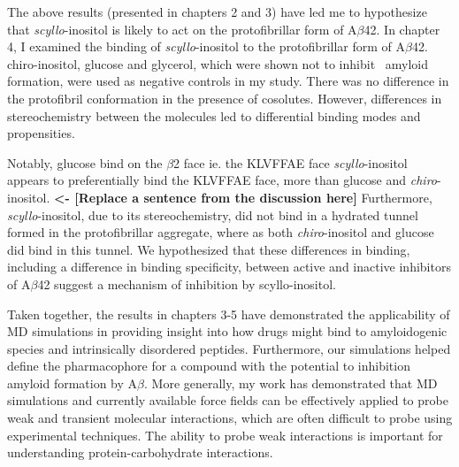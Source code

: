 The above results (presented in chapters 2 and 3) have led me to hypothesize that \textit{scyllo}-inositol is likely to act on the protofibrillar form of A$\beta$42.  In chapter 4, I examined the binding of \textit{scyllo}-inositol to the protofibrillar form of A$\beta$42. chiro-inositol, glucose and glycerol, which were shown not to inhibit \ amyloid formation, were used as negative controls in my study. There was no difference in the protofibril conformation in the presence of cosolutes. However, differences in stereochemistry between the molecules led to differential binding modes and propensities. 

Notably, glucose bind on the $\beta$2 face ie. the KLVFFAE face \textit{scyllo}-inositol appears to preferentially bind the KLVFFAE face, more than glucose and \textit{chiro}-inositol.  \textbf{<- [Replace a sentence from the discussion here]}  Furthermore, \textit{scyllo}-inositol, due to its stereochemistry, did not bind in a hydrated tunnel formed in the protofibrillar aggregate, where as both \textit{chiro}-inositol and glucose did bind in this tunnel. We hypothesized that these differences in binding, including a difference in binding specificity, between active and inactive inhibitors of A$\beta$42 suggest a mechanism of inhibition by scyllo-inositol.

Taken together, the results in chapters 3-5 have demonstrated the applicability of MD simulations in providing insight into how drugs might bind to amyloidogenic species and intrinsically disordered peptides.  Furthermore, our simulations helped define the pharmacophore for a compound with the potential to inhibition amyloid formation by A$\beta$. More generally, my work has demonstrated that MD simulations and currently available force fields can be effectively applied to probe weak and transient molecular interactions, which are often difficult to probe using experimental techniques.  The ability to probe weak interactions is important for understanding protein-carbohydrate interactions.\cite{weak binding review paper}

